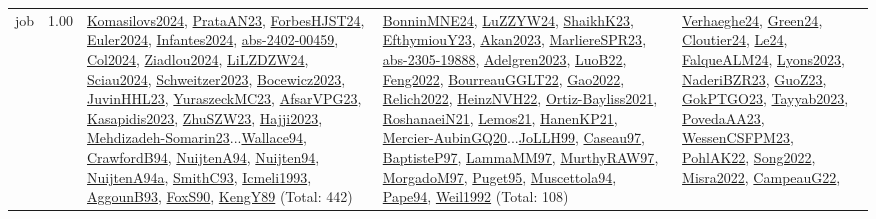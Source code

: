 {\begin{longtable}{p{3cm}r>{\raggedright\arraybackslash}p{6cm}>{\raggedright\arraybackslash}p{6cm}>{\raggedright\arraybackslash}p{8cm}}
\index{job}\index{Scheduling!job}job &  1.00 & \hyperref[detail:Komasilovs2024]{Komasilovs2024}, \hyperref[detail:PrataAN23]{PrataAN23}, \hyperref[detail:ForbesHJST24]{ForbesHJST24}, \hyperref[detail:Euler2024]{Euler2024}, \hyperref[detail:Infantes2024]{Infantes2024}, \hyperref[detail:abs-2402-00459]{abs-2402-00459}, \hyperref[detail:Col2024]{Col2024}, \hyperref[detail:Ziadlou2024]{Ziadlou2024}, \hyperref[detail:LiLZDZW24]{LiLZDZW24}, \hyperref[detail:Sciau2024]{Sciau2024}, \hyperref[detail:Schweitzer2023]{Schweitzer2023}, \hyperref[detail:Bocewicz2023]{Bocewicz2023}, \hyperref[detail:JuvinHHL23]{JuvinHHL23}, \hyperref[detail:YuraszeckMC23]{YuraszeckMC23}, \hyperref[detail:AfsarVPG23]{AfsarVPG23}, \hyperref[detail:Kasapidis2023]{Kasapidis2023}, \hyperref[detail:ZhuSZW23]{ZhuSZW23}, \hyperref[detail:Hajji2023]{Hajji2023}, \hyperref[detail:Mehdizadeh-Somarin23]{Mehdizadeh-Somarin23}...\hyperref[detail:Wallace94]{Wallace94}, \hyperref[detail:CrawfordB94]{CrawfordB94}, \hyperref[detail:NuijtenA94]{NuijtenA94}, \hyperref[detail:Nuijten94]{Nuijten94}, \hyperref[detail:NuijtenA94a]{NuijtenA94a}, \hyperref[detail:SmithC93]{SmithC93}, \hyperref[detail:Icmeli1993]{Icmeli1993}, \hyperref[detail:AggounB93]{AggounB93}, \hyperref[detail:FoxS90]{FoxS90}, \hyperref[detail:KengY89]{KengY89} (Total: 442) & \hyperref[detail:BonninMNE24]{BonninMNE24}, \hyperref[detail:LuZZYW24]{LuZZYW24}, \hyperref[detail:ShaikhK23]{ShaikhK23}, \hyperref[detail:EfthymiouY23]{EfthymiouY23}, \hyperref[detail:Akan2023]{Akan2023}, \hyperref[detail:MarliereSPR23]{MarliereSPR23}, \hyperref[detail:abs-2305-19888]{abs-2305-19888}, \hyperref[detail:Adelgren2023]{Adelgren2023}, \hyperref[detail:LuoB22]{LuoB22}, \hyperref[detail:Feng2022]{Feng2022}, \hyperref[detail:BourreauGGLT22]{BourreauGGLT22}, \hyperref[detail:Gao2022]{Gao2022}, \hyperref[detail:Relich2022]{Relich2022}, \hyperref[detail:HeinzNVH22]{HeinzNVH22}, \hyperref[detail:Ortiz-Bayliss2021]{Ortiz-Bayliss2021}, \hyperref[detail:RoshanaeiN21]{RoshanaeiN21}, \hyperref[detail:Lemos21]{Lemos21}, \hyperref[detail:HanenKP21]{HanenKP21}, \hyperref[detail:Mercier-AubinGQ20]{Mercier-AubinGQ20}...\hyperref[detail:JoLLH99]{JoLLH99}, \hyperref[detail:Caseau97]{Caseau97}, \hyperref[detail:BaptisteP97]{BaptisteP97}, \hyperref[detail:LammaMM97]{LammaMM97}, \hyperref[detail:MurthyRAW97]{MurthyRAW97}, \hyperref[detail:MorgadoM97]{MorgadoM97}, \hyperref[detail:Puget95]{Puget95}, \hyperref[detail:Muscettola94]{Muscettola94}, \hyperref[detail:Pape94]{Pape94}, \hyperref[detail:Weil1992]{Weil1992} (Total: 108) & \hyperref[detail:Verhaeghe24]{Verhaeghe24}, \hyperref[detail:Green24]{Green24}, \hyperref[detail:Cloutier24]{Cloutier24}, \hyperref[detail:Le24]{Le24}, \hyperref[detail:FalqueALM24]{FalqueALM24}, \hyperref[detail:Lyons2023]{Lyons2023}, \hyperref[detail:NaderiBZR23]{NaderiBZR23}, \hyperref[detail:GuoZ23]{GuoZ23}, \hyperref[detail:GokPTGO23]{GokPTGO23}, \hyperref[detail:Tayyab2023]{Tayyab2023}, \hyperref[detail:PovedaAA23]{PovedaAA23}, \hyperref[detail:WessenCSFPM23]{WessenCSFPM23}, \hyperref[detail:PohlAK22]{PohlAK22}, \hyperref[detail:Song2022]{Song2022}, \hyperref[detail:Misra2022]{Misra2022}, \hyperref[detail:CampeauG22]{CampeauG22}, 
\end{longtable}}
